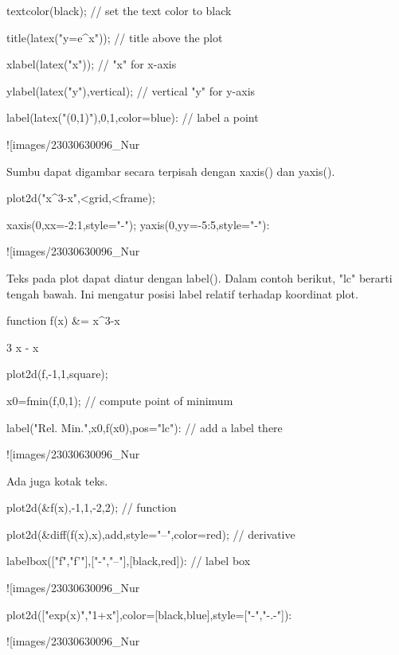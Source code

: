 \documentclass{article}
\begin{document}
\>textcolor(black); // set the text color to black

\>title(latex("y=e^x")); // title above the plot

\>xlabel(latex("x")); // "x" for x-axis

\>ylabel(latex("y"),\>vertical); // vertical "y" for y-axis

\>label(latex("(0,1)"),0,1,color=blue): // label a point


![images/23030630096_Nur%

Sumbu dapat digambar secara terpisah dengan xaxis() dan yaxis().


\>plot2d("x^3-x",<grid,<frame);

\>xaxis(0,xx=-2:1,style="-\>"); yaxis(0,yy=-5:5,style="-\>"):


![images/23030630096_Nur%

Teks pada plot dapat diatur dengan label(). Dalam contoh berikut, "lc"
berarti tengah bawah. Ini mengatur posisi label relatif terhadap
koordinat plot.


\>function f(x) &= x^3-x


    
                                     3
                                    x  - x
    

\>plot2d(f,-1,1,\>square);

\>x0=fmin(f,0,1); // compute point of minimum

\>label("Rel. Min.",x0,f(x0),pos="lc"): // add a label there


![images/23030630096_Nur%

Ada juga kotak teks.


\>plot2d(&f(x),-1,1,-2,2); // function

\>plot2d(&diff(f(x),x),\>add,style="--",color=red); // derivative

\>labelbox(["f","f'"],["-","--"],[black,red]): // label box


![images/23030630096_Nur%

\>plot2d(["exp(x)","1+x"],color=[black,blue],style=["-","-.-"]):


![images/23030630096_Nur%
\end{document}
